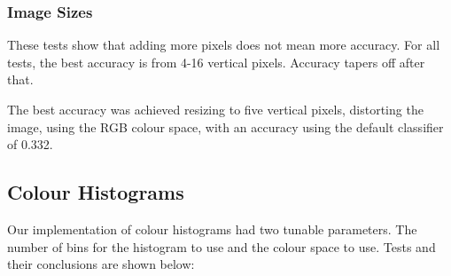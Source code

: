 \documentclass{article}
\begin{document}
\begin{multicols}{2}
\subsubsection{Image Sizes}
These tests show that adding more pixels does not mean more accuracy. For all tests, the best accuracy is from 4-16 vertical pixels. Accuracy tapers off after that.

The best accuracy was achieved resizing to five vertical pixels, distorting the image, using the RGB colour space, with an accuracy using the default classifier of 0.332.



\subsection{Colour Histograms}

Our implementation of colour histograms had two tunable parameters. The number of bins for the histogram to use and the colour space to use. Tests and their conclusions are shown below:

\begin{figure}[H]
    \centering
\end{figure}
\end{multicols}
\end{document}
